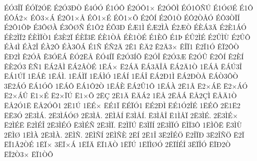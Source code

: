 {^^c9^^d33^^ce^^cf
^^c9^^d3^^cf2^^d3^^cb
^^c92^^d33^^d0^^d2
^^c94^^d3^^d3
^^c91^^d3^^d4
^^c92^^d3^^d41^^d7
^^c92^^d3^^d4^^cc
^^c9^^d31^^d4^^d1^^da
^^c91^^d3^^d8^^c9
^^c91^^d4
^^c9^^d4^^c12^^d7
^^c9^^d43^^d7^^c1
^^c92^^d41^^d7^^c5
^^c9^^d41^^d7^^c9
^^c9^^d41^^d7^^d5
^^c92^^d4^^cd
^^c92^^d41^^d2
^^c9^^d42^^d2^^c5^^d3
^^c9^^d43^^d2^^cf^^cd
^^c92^^d41^^d5^^de
^^c93^^d4^^d8^^c0
^^c93^^d4^^d8^^d1
^^c91^^d52
^^c9^^d53^^d0
^^c9^^c61^^cc
^^c9^^c62^^cc^^c0
^^c92^^c6^^d2
^^c9^^c8^^c13^^c4
^^c92^^c81^^c1^^d3
^^c9^^c82^^cc^^cf2
^^c9^^c8^^cc^^cf^^d21
^^c93^^c82^^cf
^^c9^^c8^^cf3^^cb
^^c9^^c81^^d2^^c5
^^c9^^c81^^d2^^c9
^^c91^^c8^^d5
^^c91^^de
^^c9^^db2^^cc^^c9
^^c92^^db^^cc^^d9
^^c92^^db^^d4
^^c9^^c04^^cc
^^c9^^c02^^ce
^^c9^^c02^^d4
^^c9^^c03^^d4^^c1
^^c91^^d1
^^c9^^d12^^c4
2^^ca1
^^ca^^c42
^^ca2^^c43^^d7
^^ca^^ce^^cf1
^^ca2^^cf1^^d3
^^ca^^cf2^^d4^^d2
^^ca^^d02^^cc
^^ca2^^d3^^c2
^^ca3^^d3^^cb^^c1
^^ca^^d32^^cb^^c5
^^ca^^d34^^cd^^cf
^^ca2^^d33^^cd^^d5
^^ca2^^d3^^ce
^^ca2^^d33^^c6
^^ca2^^d3^^db
^^ca2^^d4^^cd
^^ca2^^c8^^cd
^^ca^^c82^^d33
^^ca^^d11
^^cb^^c12^^c2^^cc
^^cb^^c12^^c2^^d2^^c9
1^^cb^^c1^^d7
^^cb2^^c1^^c4
^^cb^^c13^^c4^^ce^^c5
^^cb^^c12^^c41^^d2
1^^cb^^c1^^c5
^^cb^^c1^^da3^^ce
^^cb^^c11^^da^^cf
1^^cb^^c1^^ca
1^^cb^^c1^^cc.
1^^cb^^c1^^cc^^cf
1^^cb^^c1^^cc^^d3
1^^cb^^c1^^cd
1^^cb^^c1^^ce
^^cb^^c12^^d01^^cc
^^cb^^c12^^d0^^d2^^c5
^^cb^^c1^^d23^^d4^^d2
3^^cb2^^c1^^d3
^^cb^^c11^^d3^^d4
1^^cb^^c1^^d4
^^cb^^c11^^d42^^d2
1^^cb^^c1^^c8
^^cb^^c12^^db1^^d4
1^^cb^^c1^^c0
2^^cb1^^c2
^^cb2^^d7^^c1^^cb
^^cb2^^d7^^c1^^d3
^^cb2^^d7^^c1^^db
^^cb1^^d7^^c9
^^cb2^^d7^^cf^^da
^^cb1^^d7^^d5
2^^cb^^c7
2^^cb1^^c4
^^cb^^c4^^c12
1^^cb^^c5
2^^cb^^c5^^c1
^^cb^^c52^^c7^^cc
^^cb^^c5^^c41^^d2
^^cb^^c52^^d31^^cb
^^cb^^c52^^d3^^d41
2^^cb1^^da
1^^cb^^c9^^d7
^^cb^^c91^^cf
^^cb^^c9^^cf^^d31
^^cb^^c92^^d0^^cc
^^cb^^c91^^d32^^ce^^c9
1^^cb^^c9^^d4
2^^cb1^^cb2
^^cb^^cb3^^d3
2^^cb3^^cc^^c1.
2^^cb3^^cc^^c1^^d3^^d8
2^^cb3^^cc^^c5.
2^^cb^^cc^^c5^^cd
^^cb3^^cc^^c5^^cd.
^^cb3^^cc^^c5^^ce
^^cb1^^cc^^c5^^cf
2^^cb3^^cc^^c9.
2^^cb3^^cc^^c9^^d7
^^cb2^^cc^^c9^^cb
^^cb2^^cc^^c9^^ce
2^^cb3^^cc^^c9^^d3
^^cb3^^cc^^c9^^d1
2^^cb3^^cc^^cf.
^^cb2^^cc^^cf^^da
^^cb3^^cc^^cf^^cd
2^^cb3^^cc^^cf^^d3
^^cb^^cc^^cf3^^d4
1^^cb^^cc^^d5^^cb
^^cb3^^cc^^d9
2^^cb^^cc^^d8
1^^cb^^cc^^c0
2^^cb3^^cc^^c0.
2^^cb^^cc^^d1.
2^^cb^^cc^^d1^^cd
2^^cb^^cc^^d1^^c8
2^^cb^^cd
2^^cb1^^ce
3^^cb2^^ce^^c9^^d6
^^cb2^^ce^^cf^^d0
3^^cb2^^ce^^d1^^d6
^^cb2^^cf
^^cb^^cf1^^c22^^d2^^c9
1^^cb^^cf^^d7
3^^cb^^cf^^d7^^c1
1^^cb^^cf^^c4
^^cb^^cf1^^c4^^d2
1^^cb^^cf^^da
1^^cb^^cf^^cc^^d8^^d3
2^^cb^^cf^^cd^^c9^^ce
3^^cb^^cf^^ce^^d3
^^cb^^cf^^d02^^d2
^^cb^^cf2^^d23^^d7
^^cb^^cf1^^d2^^d5
}

